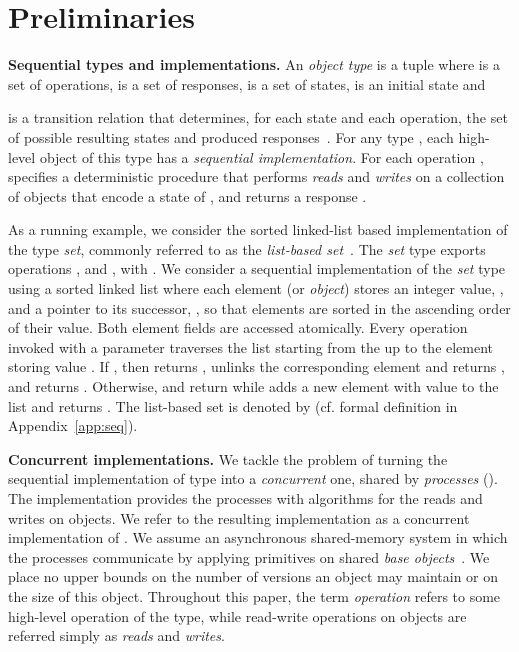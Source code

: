 \documentclass[11pt,pdftex,letterpaper]{article}
\begin{document}
 \section{Preliminaries}
\label{sec:prel}
\vspace{1mm}\noindent\textbf{Sequential types and implementations.}
An \emph{object type}  is a tuple
 where
 is a set of operations,
 is a set of responses,  is a set of states,  is an
initial state and 
 
is a transition relation that determines, for each state
and each operation, the set of possible
resulting states and produced responses~\cite{AFHHT07}. 
For any type , each high-level object  of this type has a \emph{sequential implementation}. 
For each operation , 
 specifies a deterministic procedure that 
performs \emph{reads} and \emph{writes} on a collection of objects
 that encode a state of , and returns a response . 

As a running example, we consider the sorted linked-list based implementation of the type \emph{set}, commonly referred to 
as the \emph{list-based set}~\cite{HS08-book}.
The \emph{set} type exports operations ,  and
, with .
We consider a sequential implementation 
of the \emph{set} type using a sorted linked list where 
each element (or \emph{object}) stores an integer value, , and a pointer to its successor, , so that elements are 
sorted in the ascending order of their value.  
Both element fields are accessed atomically.
Every operation invoked with a parameter  traverses the list starting from the
 up to the element storing value .
If , then  returns ,  unlinks the 
corresponding element and returns , and  returns . Otherwise, 
 and  return
 while  adds a new element with value
 to the list and returns . 
The list-based set 
is denoted by  (cf. formal definition in Appendix~\ref{app:seq}).

\vspace{1mm}\noindent\textbf{Concurrent implementations.}
We tackle the problem of turning the sequential
implementation  of type  into a \emph{concurrent} one, shared by 
 \emph{processes}  ().
The implementation provides the processes with algorithms 
for the reads and writes on objects.
We refer to the resulting implementation as a concurrent implementation of .
We assume an asynchronous shared-memory system in which the processes communicate by
applying primitives on shared \emph{base objects}~\cite{Her91}.
We place no upper bounds on the number of versions an object may maintain or on the size of this object.
Throughout this paper, the term \emph{operation} refers to some
high-level operation of the type, 
while read-write operations on objects are referred simply 
as \emph{reads} and \emph{writes}.
\end{document}
